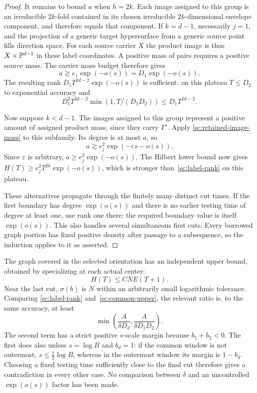 \begin{proof}
It remains to bound $a$ when $h=2k$.  Each image assigned to this group
is an irreducible $2k$-fold contained in its chosen irreducible
$2k$-dimensional envelope component, and therefore equals that component.
If $k=d-1$, necessarily $j=1$, and the projection of a generic
target hypersurface from a generic source point fills direction
space.  For each source carrier $X$ the product image is thus
$X\times\mathbb P^{d-1}$ in these label coordinates.  A positive
mass of pairs requires a positive source mass.  The carrier
mass budget therefore gives
\[
 a\gtrsim e_1\exp(-o(s))=D_1\exp(-o(s)).
\]
The resulting rank $D_1T^{2d-2}\exp(-o(s))$ is sufficient:
on this plateau $T\le D_2$ to exponential accuracy and
\[
 D_1^2T^{2d-2}\min(1,T/(D_1D_2))
 \le D_1T^{2d-2}.
\]

Now suppose $k<d-1$.  The images assigned to this group represent
a positive amount of assigned product mass, since they carry
$\Gamma'$.  Apply \eqref{sc:retained-image-mass} to this subfamily.
Its degree is at most $a$, so
\[
 a\gtrsim e_j^2\exp(-\varepsilon s-o(s)).
\]
Since $\varepsilon$ is arbitrary, $a\ge e_j^2\exp(-o(s))$.
The Hilbert lower bound now gives $H(T)\ge e_j^2T^{2k}\exp(-o(s))$,
which is stronger than~\eqref{sc:label-rank} on this plateau.

These alternatives propagate through the finitely many distinct
cut times.  If the first boundary has degree $\exp(o(s))$ and
there is no earlier testing time of degree at least one, use
rank one there; the required boundary value is itself
$\exp(o(s))$.  This also handles several simultaneous first
cuts.  Every borrowed graph portion has fixed positive density
after passage to a subsequence, so the induction applies to it
as asserted.
\end{proof}

The graph covered in the selected orientation has an independent
upper bound, obtained by specializing at each actual center:
\begin{equation}\label{sc:common-upper}
 H(T)\le CNE(T+1).
\end{equation}
Near the last cut, $\sigma(b)$ is $N$ within an arbitrarily
small logarithmic tolerance.  Comparing
\eqref{sc:label-rank} and~\eqref{sc:common-upper}, the relevant
ratio is, to the same accuracy, at least
\begin{equation}\label{sc:common-ratio}
 \min\left(\frac{A}{\delta D_d},
            \frac{A}{\delta D_1D_2}\right).
\end{equation}
The second term has a strict positive $s$-scale margin because
$b_1+b_2<0$.  The first does also unless $s=\log B$ and $b_d=1$:
if the common window is not outermost, $s\le\tfrac12\log B$,
whereas in the outermost window its margin is $1-b_d$.
Choosing a fixed testing time sufficiently close to the final
cut therefore gives a contradiction in every other case.
No comparison between $\delta$ and an uncontrolled
$\exp(o(s))$ factor has been made.

